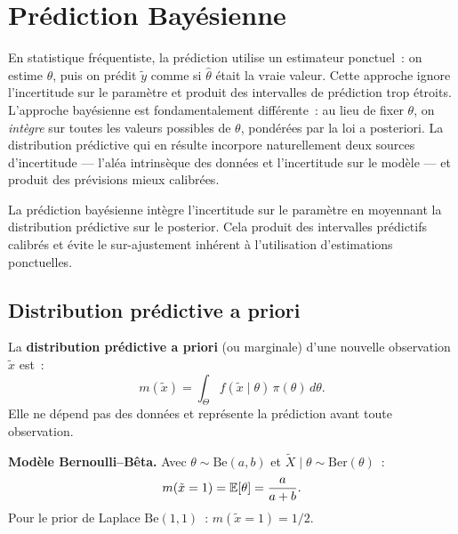 \chapter{Pr\'ediction Bay\'esienne}
\label{ch:prediction}

En statistique fr\'equentiste, la pr\'ediction utilise un estimateur ponctuel~: on estime $\theta$, puis on pr\'edit $\tilde{y}$ comme si $\hat\theta$ \'etait la vraie valeur. Cette approche ignore l'incertitude sur le param\`etre et produit des intervalles de pr\'ediction trop \'etroits. L'approche bay\'esienne est fondamentalement diff\'erente~: au lieu de fixer $\theta$, on \emph{int\`egre} sur toutes les valeurs possibles de $\theta$, pond\'er\'ees par la loi a posteriori. La distribution pr\'edictive qui en r\'esulte incorpore naturellement deux sources d'incertitude --- l'al\'ea intrins\`eque des donn\'ees et l'incertitude sur le mod\`ele --- et produit des pr\'evisions mieux calibr\'ees.

\begin{intuition}[title=\textbf{Id\'ee centrale}]
La pr\'ediction bay\'esienne int\`egre l'incertitude sur le param\`etre
en moyennant la distribution pr\'edictive sur le posterior. Cela produit
des intervalles pr\'edictifs calibr\'es et \'evite le sur-ajustement
inh\'erent \`a l'utilisation d'estimations ponctuelles.
\end{intuition}

\section{Distribution pr\'edictive a priori}

\begin{definition}
La \textbf{distribution pr\'edictive a priori} (ou marginale) d'une
nouvelle observation $\tilde{x}$ est~:
\[
  m(\tilde{x}) = \int_\Theta f(\tilde{x} \mid \theta)\,\pi(\theta)\,d\theta.
\]
Elle ne d\'epend pas des donn\'ees et repr\'esente la pr\'ediction avant
toute observation.
\end{definition}

\begin{exemple}
\textbf{Mod\`ele Bernoulli--B\^eta.}
Avec $\theta \sim \text{Be}(a, b)$ et $\tilde{X} \mid \theta \sim \text{Ber}(\theta)$~:
\[
  m(\tilde{x} = 1) = \mathbb{E}[\theta] = \frac{a}{a + b}.
\]
Pour le prior de Laplace $\text{Be}(1, 1)$~: $m(\tilde{x} = 1) = 1/2$.
\end{exemple}

